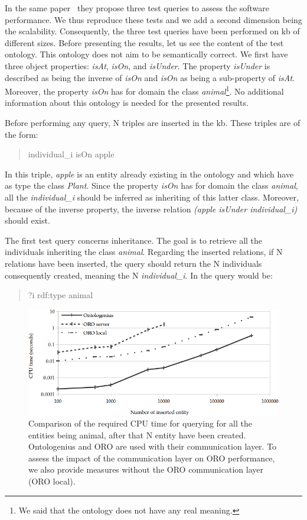 In the same paper~\cite{lemaignan_2010_oro} they propose three test queries to assess the software performance. We thus reproduce these tests and we add a second dimension being the scalability. Consequently, the three test queries have been performed on \acrshort{kb} of different sizes. Before presenting the results, let us see the content of the test ontology. This ontology does not aim to be semantically correct. We first have three object properties: \textit{isAt}, \textit{isOn}, and \textit{isUnder}. The property \textit{isUnder} is described as being the inverse of \textit{isOn} and \textit{isOn} as being a sub-property of \textit{isAt}. Moreover, the property \textit{isOn} has for domain the class \textit{animal}\footnote{We said that the ontology does not have any real meaning.}. No additional information about this ontology is needed for the presented results.

Before performing any query, N triples are inserted in the \acrshort{kb}. These triples are of the form:

\begin{quote} 
\centering 
individual\_i isOn apple
\end{quote}

In this triple, \textit{apple} is an entity already existing in the ontology and which have as type the class \textit{Plant}. Since the property \textit{isOn} has for domain the class \textit{animal}, all the \textit{individual\_i} should be inferred as inheriting of this latter class. Moreover, because of the inverse property, the inverse relation \textit{(apple isUnder individual\_i)} should exist.

The first test query concerns inheritance. The goal is to retrieve all the individuals inheriting the class \textit{animal}. Regarding the inserted relations, if N relations have been inserted, the query should return the N individuals consequently created, meaning the N \textit{individual\_i}. In \sparql{} the query would be:

\begin{quote} 
\centering 
?i rdf:type animal
\end{quote}

\begin{figure}[ht!]
\centering
\includegraphics[width=\textwidth]{figures/chapter2/oro/R1.png}
\caption{\label{fig:chap2_oro_r1}Comparison of the required CPU time for querying for all the entities being animal, after that N entity have been created. Ontologenius and ORO are used with their communication layer. To assess the impact of the communication layer on ORO performance, we also provide measures without the ORO communication layer (ORO local).}
\end{figure}

